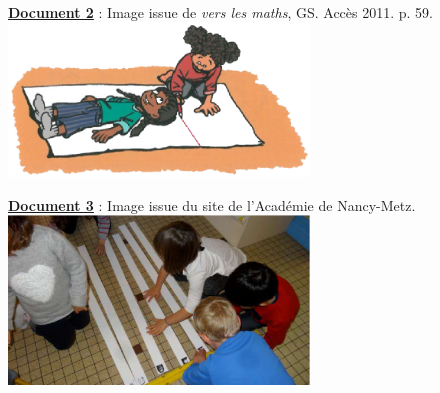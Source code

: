 {\ \\


\begin{minipage}{8cm}
   {\bf\uline{Document 2}} : Image issue de {\it vers les maths}, GS. Accès 2011. p. 59. \\ [2mm]
   \includegraphics[width=8cm]{Grandeurs_mesures_did/Images/Grm7_crpe_taille3}
\end{minipage}
\qquad
\begin{minipage}{8cm}
   {\bf\uline{Document 3}} : Image issue du site de l'Académie de Nancy-Metz. \\ [2mm] 
   \includegraphics[width=8cm]{Grandeurs_mesures_did/Images/Grm7_crpe_taille4}
\end{minipage}



\analyses %

}
